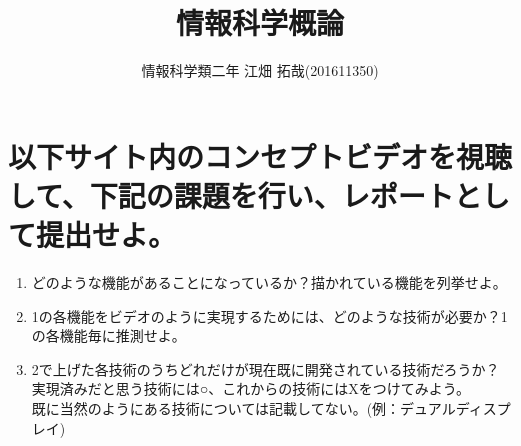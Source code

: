 \documentclass{scrartcl}
\author{情報科学類二年 江畑 拓哉(201611350)}
\date{}
\title{情報科学概論}
\begin{document}
\maketitle

\section{以下サイト内のコンセプトビデオを視聴して、下記の課題を行い、レポートとして提出せよ。}
\label{sec:orgd41f192}
\begin{enumerate}
\item どのような機能があることになっているか？描かれている機能を列挙せよ。\\
\item 1の各機能をビデオのように実現するためには、どのような技術が必要か？1の各機能毎に推測せよ。\\
\item 2で上げた各技術のうちどれだけが現在既に開発されている技術だろうか？実現済みだと思う技術には○、これからの技術にはXをつけてみよう。\\

既に当然のようにある技術については記載してない。(例：デュアルディスプレイ)\\
\end{enumerate}
\end{document}
